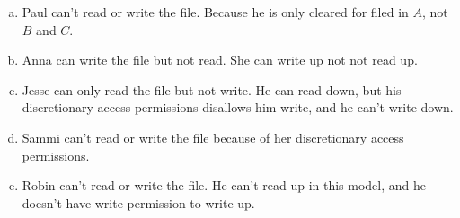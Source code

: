 \begin{enumerate}[(a)]
    \item Paul can't read or write the file. Because he is only cleared for filed in $A$, not $B$ and $C$.
    \item Anna can write the file but not read. She can write up not not read up.
    \item Jesse can only read the file but not write. He can read down, but his discretionary access permissions disallows him write, and he can't write down.
    \item Sammi can't read or write the file because of her discretionary access permissions.
    \item Robin can't read or write the file. He can't read up in this model, and he doesn't have write permission to write up.
\end{enumerate}